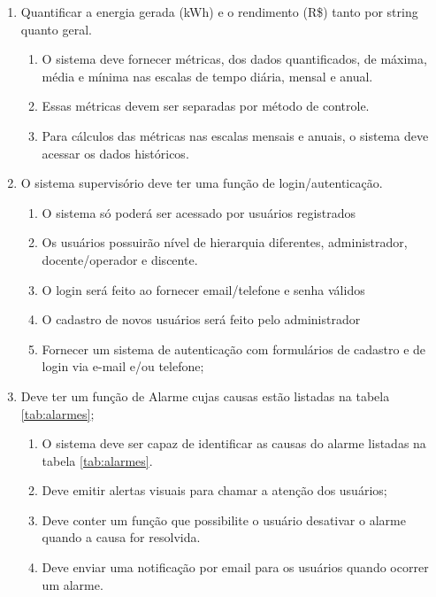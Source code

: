\documentclass[a4paper,12pt]{article}
\begin{document}
\begin{enumerate}
    \item Quantificar a energia gerada (kWh) e o rendimento (R\$) tanto por string quanto geral.
        \begin{enumerate}
            \item O sistema deve fornecer métricas, dos dados quantificados, de máxima, média e mínima nas escalas de tempo diária, mensal e anual.
            \item Essas métricas devem ser separadas por método de controle.
            \item Para cálculos das métricas nas escalas mensais e anuais, o sistema deve acessar os dados históricos.
        \end{enumerate}

    \item O sistema supervisório deve ter uma função de login/autenticação.
        \begin{enumerate}
            \item O sistema só poderá ser acessado por usuários registrados
            \item Os usuários possuirão nível de hierarquia diferentes, administrador, docente/operador e discente.
            \item O login será feito ao fornecer email/telefone e senha válidos
            \item O cadastro de novos usuários será feito pelo administrador
            \item Fornecer um sistema de autenticação com formulários de cadastro e de login via e-mail e/ou telefone; 
        \end{enumerate}

        \item Deve ter um função de Alarme cujas causas estão listadas na tabela \ref{tab:alarmes};
        \begin{enumerate}
            \item O sistema deve ser capaz de identificar as causas do alarme listadas na tabela \ref{tab:alarmes}.
            \item Deve emitir alertas visuais para chamar a atenção dos usuários;
            \item Deve conter um função que possibilite o usuário desativar o alarme quando a causa for resolvida.
            \item Deve enviar uma notificação por email para os usuários quando ocorrer um alarme.
        \end{enumerate}


\end{enumerate}
\end{document}
